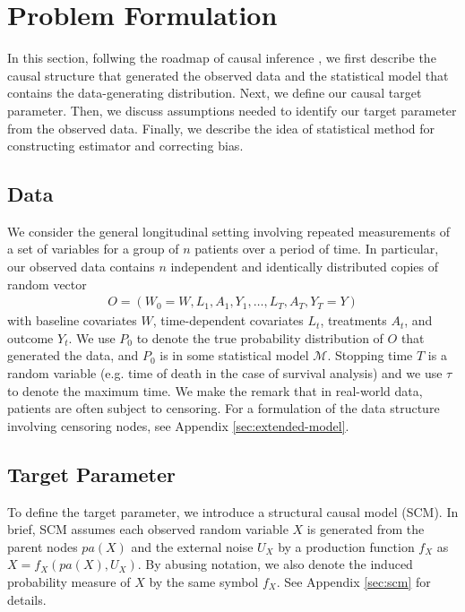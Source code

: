 \documentclass{article}
\theoremstyle{plain}
\theoremstyle{definition}
\theoremstyle{remark}
\begin{document}
\section{Problem Formulation}
In this section, follwing the roadmap of causal inference \cite{petersenCausalModelsLearning2014,van2018targeted,dangCausalRoadmapGenerating2023}, we first describe the causal structure that generated the observed data and the statistical model that contains the data-generating distribution. Next, we define our causal target parameter. Then, we discuss assumptions needed to identify our target parameter from the observed data. Finally, we describe the idea of statistical method for constructing estimator and correcting bias.

\subsection{Data}
We consider the general longitudinal setting involving repeated measurements of a set of variables for a group of $n$ patients over a period of time. In particular, our observed data contains $n$ independent and identically distributed copies of random vector 
\begin{align}
    O=(W_0 = W, L_1, A_1, Y_1, \ldots, L_T, A_T, Y_T = Y)
\end{align}
with baseline covariates $W$, time-dependent covariates $L_t$, treatments $A_t$, and outcome $Y_t$. We use $P_0$ to denote the true probability distribution of $O$ that generated the data, and $P_0$ is in some statistical model $\mathcal{M}$. Stopping time $T$ is a random variable (e.g. time of death in the case of survival analysis) and we use $\tau$ to denote the maximum time. We make the remark that in real-world data, patients are often subject to censoring. For a formulation of the data structure involving censoring nodes, see Appendix \ref{sec:extended-model}.

\subsection{Target Parameter}

To define the target parameter, we introduce a structural causal model (SCM). In brief, SCM assumes each observed random variable $X$ is generated from the parent nodes $pa(X)$ and the external noise $U_X$ by a production function $f_X$ as $X = f_X(pa(X), U_X)$. By abusing notation, we also denote the induced probability measure of $X$ by the same symbol $f_X$. See Appendix \ref{sec:scm} for details.
\end{document}
